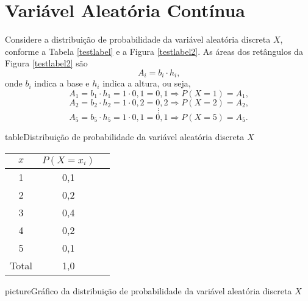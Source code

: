 \documentclass[11pt,fleqn]{book}
\numberwithin{mpicture}{chapter}
\numberwithin{mtable}{chapter}
\numberwithin{mframe}{chapter}
\begin{document}
\opensidepicturearea

\chapter{Variável Aleatória Contínua}

\nocite{livro_bussab_morettin}
Considere a distribuição de probabilidade da variável aleatória discreta $X$, conforme a Tabela \ref{testlabel} e a Figura \ref{testlabel2}. As áreas dos retângulos da Figura \ref{testlabel2} são 
\[
	A_i = b_i\cdot h_i
	\text{,}
\]
onde $b_i$ indica a base e $h_i$ indica a altura, ou seja,
\[
	A_1 = b_1 \cdot h_1 = 1 \cdot 0,1 = 0,1 \Longrightarrow P(X=1)=A_1
	\text{,}
\]
\[
	A_2 = b_2 \cdot h_2 = 1 \cdot 0,2 = 0,2 \Longrightarrow P(X=2)=A_2
	\text{,}
\]
\[
	\vdots
\]
\[
	A_5 = b_5 \cdot h_5 = 1 \cdot 0,1 = 0,1 \Longrightarrow P(X=5)=A_5
	\text{.}
\]

\begin{sidepicture}{7cm}{table}{Distribuição de probabilidade da variável aleatória discreta $X$}
	\label{testlabel}
	\begin{tabular}{ccc}\\\toprule  
		$x$ & $P(X=x_i)$ \\ \midrule
		1 & 0,1 \\
		2 & 0,2 \\ 
		3 & 0,4 \\
		4 & 0,2 \\
		5 & 0,1 \\ \midrule
		Total & 1,0\\  \bottomrule
	\end{tabular}
\end{sidepicture}

\begin{sidepicture}{1cm}{picture}{Gráfico da distribuição de probabilidade da variável aleatória discreta $X$}
	\label{testlabel2}
\end{sidepicture}
\end{document}
